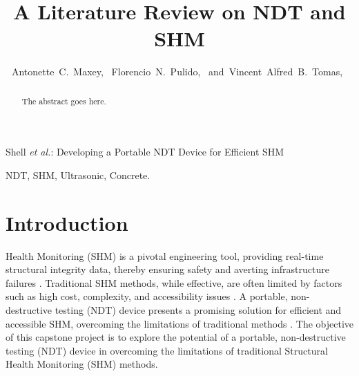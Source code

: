 \documentclass[journal, a4paper]{IEEEtran}
\begin{document}
\title{A Literature Review on NDT and SHM}


\author{Antonette~C.~Maxey,~
        Florencio~N.~Pulido,~
        and~Vincent~Alfred~B.~Tomas,~%
}



%
{Shell \MakeLowercase{\textit{et al.}}: Developing a Portable NDT Device for Efficient SHM}


\maketitle


\begin{abstract}
The abstract goes here. \lipsum[1]
\end{abstract}


\begin{IEEEkeywords}
  NDT, SHM, Ultrasonic, Concrete.
\end{IEEEkeywords}







\section{Introduction}
 Health Monitoring (SHM) is a pivotal engineering tool, providing real-time structural integrity data,
thereby ensuring safety and averting infrastructure failures \cite{Gharehbaghi2022} \cite{Katam2023}.
Traditional SHM methods, while effective, are often limited by factors such as
high cost, complexity, and accessibility issues \cite{Katam2023} \cite{Gharehbaghi2022}.
A portable, non-destructive testing (NDT) device presents a promising solution for efficient and accessible SHM,
overcoming the limitations of traditional methods \cite{Guo2022} \cite{Chen2023}.
The objective of this capstone project is to explore the potential of a portable,
non-destructive testing (NDT) device in overcoming the limitations of traditional Structural Health Monitoring (SHM) methods.
\end{document}
